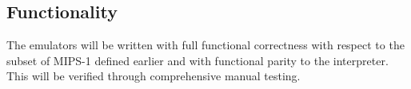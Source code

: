 \subsection{Functionality}

The emulators will be written with full functional correctness with respect to the subset of MIPS-1 defined earlier and with functional parity to the interpreter. This will be verified through comprehensive manual testing.